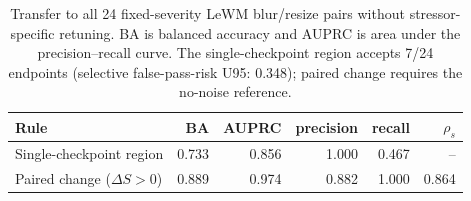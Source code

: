 \begin{table}[t]
\centering
\caption{Transfer to all 24 fixed-severity LeWM blur/resize pairs without stressor-specific retuning. BA is balanced accuracy and AUPRC is area under the precision--recall curve. The single-checkpoint region accepts 7/24 endpoints (selective false-pass-risk U95: 0.348); paired change requires the no-noise reference.}
\label{tab:cross-stressor-transfer}
\footnotesize
\setlength{\tabcolsep}{4pt}
\begin{tabular}{lrrrrr}
\toprule
Rule & BA & AUPRC & precision & recall & $\rho_s$ \\
\midrule
Single-checkpoint region & 0.733 & 0.856 & 1.000 & 0.467 & -- \\
Paired change ($\Delta S>0$) & 0.889 & 0.974 & 0.882 & 1.000 & 0.864 \\
\bottomrule
\end{tabular}
\end{table}
